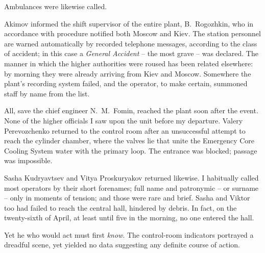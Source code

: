 \documentclass[openright]{bookest}
\begin{document}
Ambulances were likewise called.

Akimov informed the shift supervisor of the entire plant, B.~Rogozhkin, who in accordance with procedure notified both Moscow and Kiev. The station personnel are warned automatically by recorded telephone messages, according to the class of accident; in this case a \textit{General Accident} -- the most grave -- was declared. The manner in which the higher authorities were roused has been related elsewhere: by morning they were already arriving from Kiev and Moscow. Somewhere the plant's recording system failed, and the operator, to make certain, summoned staff by name from the list.

All, save the chief engineer N.~M.~Fomin, reached the plant soon after the event. None of the higher officials I saw upon the unit before my departure. Valery Perevozchenko returned to the control room after an unsuccessful attempt to reach the cylinder chamber, where the valves lie that unite the Emergency Core Cooling System water with the primary loop. The entrance was blocked; passage was impossible.

Sasha Kudryavtsev and Vitya Proskuryakov returned likewise. I habitually called most operators by their short forenames; full name and patronymic -- or surname -- only in moments of tension; and those were rare and brief. Sasha and Viktor too had failed to reach the central hall, hindered by debris. In fact, on the twenty-sixth of April, at least until five in the morning, no one entered the hall.

Yet he who would act must first \textit{know}. The control-room indicators portrayed a dreadful scene, yet yielded no data suggesting any definite course of action.
\end{document}
